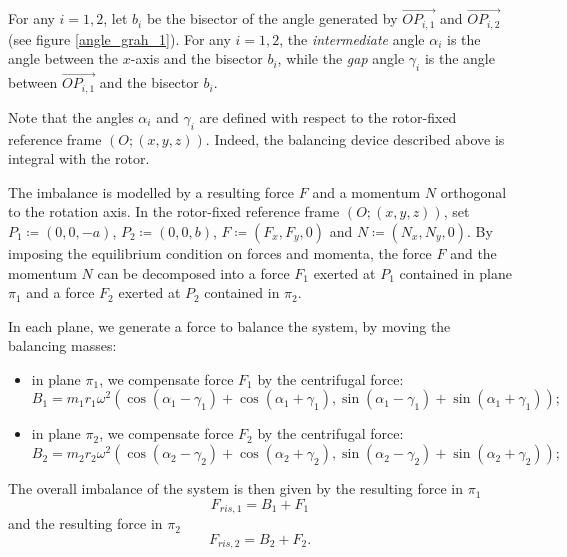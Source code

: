 \documentclass{aims}
\theoremstyle{definition}
\begin{document}
	For any $i=1,2$, let $b_i$ be the bisector of the angle generated by $\overset{\longrightarrow}{OP_{i,1}}$ and $\overset{\longrightarrow}{OP_{i,2}}$ (see figure \ref{angle_grah_1}). For any $i=1,2$, the \textit{intermediate} angle $\alpha_i$ is the angle between the $x$-axis and the bisector $b_i$, while the \textit{gap} angle $\gamma_i$ is the angle between $\overset{\longrightarrow}{OP_{i,1}}$ and the bisector $b_i$.
	
	Note that the angles $\alpha_i$ and $\gamma_i$ are defined with respect to the rotor-fixed reference frame $(O;(x,y,z))$. Indeed, the balancing device described above is integral with the rotor.
	
	The imbalance is modelled by a resulting force $F$ and a momentum $N$ orthogonal to the rotation axis. In the rotor-fixed reference frame $(O;(x,y,z))$, set $P_1\coloneqq (0,0,-a)$, $P_2\coloneqq (0,0,b)$, $F\coloneqq (F_x,F_y,0)$ and $N\coloneqq (N_x,N_y,0)$. By imposing the equilibrium condition on forces and momenta, the force $F$ and the momentum $N$ can be decomposed into a force $F_1$ exerted at $P_1$ contained in plane $\pi_1$ and a force $F_2$ exerted at $P_2$ contained in $\pi_2$.
	
	In each plane, we generate a force to balance the system, by moving the balancing masses:
	\begin{itemize}
		\item in plane $\pi_1$, we compensate force $F_1$ by the centrifugal force:
		\begin{equation}\label{B_1}
		B_1=m_1r_1\omega^2\left(\cos(\alpha_1-\gamma_1)+\cos(\alpha_1+\gamma_1),\sin(\alpha_1-\gamma_1)+\sin(\alpha_1+\gamma_1)\right);
		\end{equation}
		\item in plane $\pi_2$, we compensate force $F_2$ by the centrifugal force:
		\begin{equation}\label{B_2}
		B_2=m_2r_2\omega^2\left(\cos(\alpha_2-\gamma_2)+\cos(\alpha_2+\gamma_2),\sin(\alpha_2-\gamma_2)+\sin(\alpha_2+\gamma_2)\right);	
		\end{equation}
	\end{itemize}
	
	The overall imbalance of the system is then given by the resulting force in $\pi_1$
	\begin{equation*}
	F_{ris,1}=B_1+F_1
	\end{equation*}
	and the resulting force in $\pi_2$
	\begin{equation*}
	F_{ris,2}=B_2+F_2.
	\end{equation*}
	
\end{document}
